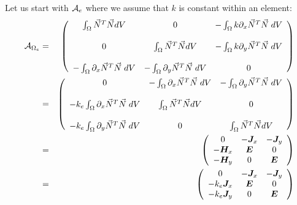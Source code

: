 
Let us start with ${\cal A}_e$ where we assume that $k$ is constant within an element:
\begin{eqnarray}
{\cal A}_{\Omega_e}&=&
\left(
\begin{array}{ccc}
\int_\Omega \vec{N}^T \vec{N} dV & 0 & -\int_\Omega k \partial_x \vec{N}^T \vec{N} \; dV \\ \\
0 & \int_\Omega \vec{N}^T \vec{N} dV & -\int_\Omega k \partial_y \vec{N}^T \vec{N} \; dV \\ \\
- \int_{\Omega} \partial_x \vec{N}^T \vec{N}   \; dV & 
- \int_{\Omega} \partial_y \vec{N}^T \vec{N}   \; dV & 0 
\end{array}
\right) \\
&=&
\left(
\begin{array}{ccc}
0 & - \int_{\Omega} \partial_x \vec{N}^T \vec{N}   \; dV  & - \int_{\Omega} \partial_y \vec{N}^T \vec{N}   \; dV  \\ \\
-k_e \int_\Omega \partial_x \vec{N}^T \vec{N} \; dV & \int_\Omega \vec{N}^T\vec{N} dV & 0 \\  \\
-k_e \int_\Omega \partial_y \vec{N}^T \vec{N} \; dV & 0 & \int_\Omega \vec{N}^T\vec{N} dV  
\end{array}
\right) \nonumber\\
&=&
\left(
\begin{array}{ccc}
0 & -{\bm J}_x & -{\bm J}_y \\
-{\bm H}_x & {\bm E} & 0 \\
-{\bm H}_y & 0 & {\bm E} 
\end{array}
\right) \nonumber\\
&=&
\left(
\begin{array}{ccc}
0 & -{\bm J}_x & -{\bm J}_y \\
-k_e{\bm J}_x & {\bm E} & 0 \\
-k_e{\bm J}_y & 0 & {\bm E} 
\end{array}
\right)
\end{eqnarray}

